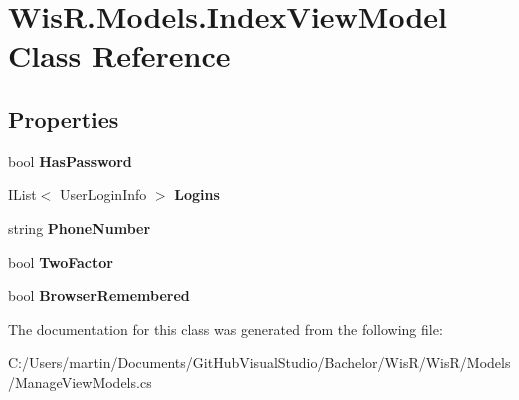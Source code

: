 \hypertarget{class_wis_r_1_1_models_1_1_index_view_model}{}\section{Wis\+R.\+Models.\+Index\+View\+Model Class Reference}
\label{class_wis_r_1_1_models_1_1_index_view_model}
\subsection*{Properties}
\begin{DoxyCompactItemize}
\item 
\hypertarget{class_wis_r_1_1_models_1_1_index_view_model_a7213ba21f7505bbd188467890a25f85d}{}bool {\bfseries Has\+Password}\label{class_wis_r_1_1_models_1_1_index_view_model_a7213ba21f7505bbd188467890a25f85d}

\item 
\hypertarget{class_wis_r_1_1_models_1_1_index_view_model_aefdad280a80157f8d15e2f23a36deb2b}{}I\+List$<$ User\+Login\+Info $>$ {\bfseries Logins}\label{class_wis_r_1_1_models_1_1_index_view_model_aefdad280a80157f8d15e2f23a36deb2b}

\item 
\hypertarget{class_wis_r_1_1_models_1_1_index_view_model_a43775764d3974df2bae6e4377f8eb4e4}{}string {\bfseries Phone\+Number}\label{class_wis_r_1_1_models_1_1_index_view_model_a43775764d3974df2bae6e4377f8eb4e4}

\item 
\hypertarget{class_wis_r_1_1_models_1_1_index_view_model_a33075fd371ceb910eb4e1d367fe9c055}{}bool {\bfseries Two\+Factor}\label{class_wis_r_1_1_models_1_1_index_view_model_a33075fd371ceb910eb4e1d367fe9c055}

\item 
\hypertarget{class_wis_r_1_1_models_1_1_index_view_model_a1af308eedb858054e724670ec2182b28}{}bool {\bfseries Browser\+Remembered}\label{class_wis_r_1_1_models_1_1_index_view_model_a1af308eedb858054e724670ec2182b28}

\end{DoxyCompactItemize}


The documentation for this class was generated from the following file\+:\begin{DoxyCompactItemize}
\item 
C\+:/\+Users/martin/\+Documents/\+Git\+Hub\+Visual\+Studio/\+Bachelor/\+Wis\+R/\+Wis\+R/\+Models/Manage\+View\+Models.\+cs\end{DoxyCompactItemize}
